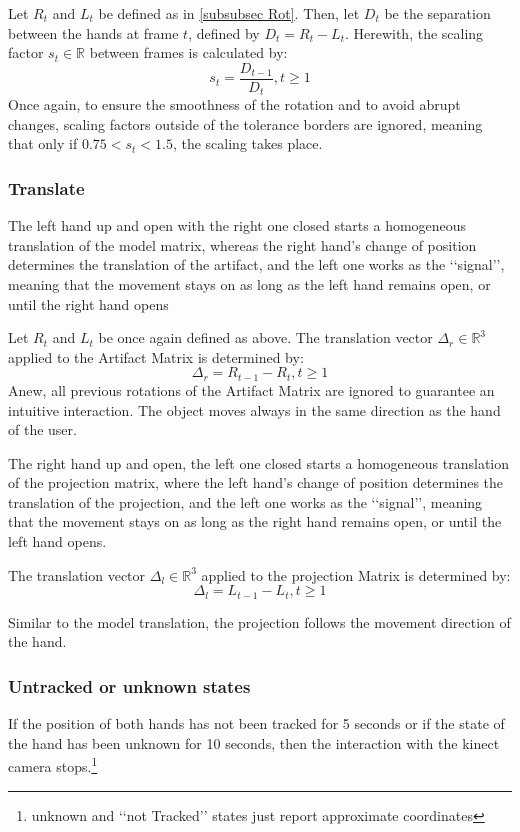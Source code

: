 \documentclass[12pt]{extarticle}
\newcommand{\R}{\mathbb{R}}
\begin{document}
Let $R_t$ and $L_t$ be defined as in \ref{subsubsec Rot}. Then, let $D_t$ be the separation between the hands at frame $t$, defined by $D_t=R_{t}-L_{t}$. Herewith, the scaling factor $s_t\in \R$ between frames is calculated by:
$$s_t=\frac{D_{t-1}}{D_t}, t\geq 1$$
Once again, to ensure the smoothness of the rotation and to avoid abrupt changes, scaling factors outside of the tolerance borders are ignored, meaning that only if $0.75<s_t<1.5$, the scaling takes place.


\subsubsection {Translate} \label{subsubsec: Translate} The left hand up and open with the right one closed starts a homogeneous translation of the model matrix, whereas the right hand\rq{}s change of position determines the translation of the artifact, and the left one works as the \lq\lq{}signal\rq\rq{}, meaning that the movement stays on as long as the left hand remains open, or until the right hand opens

Let $R_t$ and $L_t$ be once again defined as above. The translation vector $\Delta_r\in \R^3$ applied to the Artifact Matrix is determined by:
$$\Delta_r=R_{t-1}-R_t, t\geq 1$$
Anew, all previous rotations of the Artifact Matrix are ignored to guarantee an intuitive interaction. The object moves always in the same direction as the hand of the user.

The right hand up and open, the left one closed starts a homogeneous translation of the projection matrix, where the left hand\rq{}s change of position determines the translation of the projection, and the left one works as the \lq\lq{}signal\rq\rq{}, meaning that the movement stays on as long as the right hand remains open, or until the left hand opens.

The translation vector $\Delta_l\in \R^3$ applied to the projection Matrix is determined by:
$$\Delta_l=L_{t-1}-L_t, t\geq 1$$

Similar to the model translation, the projection follows the movement direction of the hand.
\subsubsection {Untracked or unknown states} If the position of both hands has not been tracked for 5 seconds or if the state of the hand has been unknown for 10 seconds, then the interaction with the kinect camera stops.\footnote{unknown and \lq\lq{}not Tracked\rq\rq{} states just report approximate coordinates} 
\end{document}

